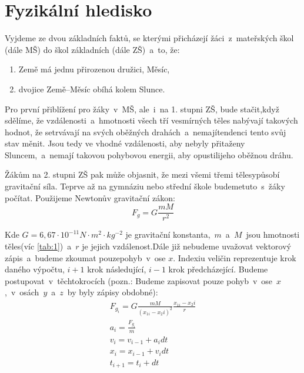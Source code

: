 \documentclass[FM,BP]{tulthesis}
\begin{document}
\section{Fyzikální hledisko}
Vyjdeme ze dvou základních faktů, se kterými přicházejí žáci~z~mateřských škol (dále MŠ) do škol základních (dále ZŠ)~a~to, že:
\begin{enumerate}
    \item Země má jednu přirozenou družici, Měsíc,
    \item dvojice Země–Měsíc obíhá kolem Slunce.
\end{enumerate}

Pro první přiblížení pro žáky~v~MŠ, ale~i~na 1. stupni ZŠ, bude stačit,když sdělíme, že vzdálenosti~a~hmotnosti všech tří vesmírných těles nabývají takových hodnot, že setrvávají na svých oběžných drahách~a~nemajítendenci tento svůj stav měnit. Jsou tedy ve vhodné vzdálenosti, aby nebyly přitaženy Sluncem,~a~nemají takovou pohybovou energii, aby opustilijeho oběžnou dráhu.

Žákům na 2. stupni ZŠ pak může objasnit, že mezi všemi třemi tělesypůsobí gravitační síla. Teprve až na gymnáziu nebo střední škole budemetuto~s~žáky počítat. Použijeme Newtonův gravitační zákon:
\begin{equation}
F_g=G\frac{mM}{r^2}
\end{equation}

Kde $G = 6,67·10^{−11}N·m^2·kg^{−2}$ je gravitační konstanta,~$m$~a~$M$~jsou hmotnosti těles(víc \ref{tab:1})~a~$r$ je jejich vzdálenost.Dále již nebudeme uvažovat vektorový zápis~a~budeme zkoumat pouzepohyb~v~ose $x$. Indexiu veličin reprezentuje krok daného výpočtu, $i + 1$ krok následující, $i − 1$ krok předcházející. Budeme postupovat~v~těchtokrocích (pozn.: Budeme zapisovat pouze pohyb~v~ose~$x$,~v~osách~$y$~a~$z$~by byly zápisy obdobné):
\begin{gather*}
F_{g_i}=G\frac{mM}{(x_{1i}-x_2i)^2}\frac{x_{1i}-x_2i}{r}\\
a_i=\frac{F_{g_i}}{m}\\
v_i = v_{i-1} + a_{i}dt\\
x_i = x_{i-1} + v_{i}dt\\
t_{i+1} = t_i + dt
\end{gather*}
\end{document}
